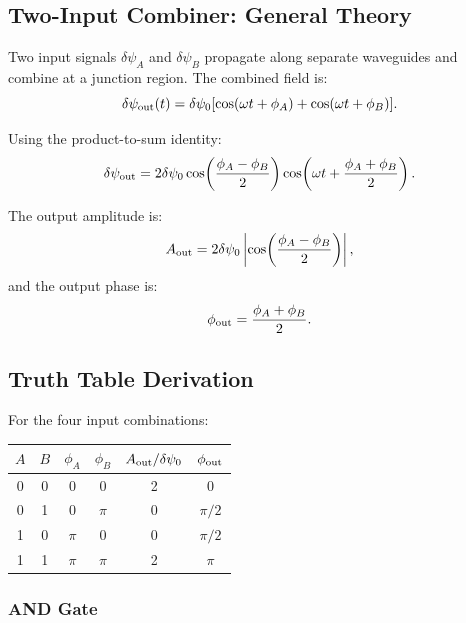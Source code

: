 \documentclass[aps,prd,twocolumn,superscriptaddress,nofootinbib,floatfix]{revtex4-2}
\begin{document}
\subsection{Two-Input Combiner: General Theory}

Two input signals $\delta\psi_A$ and $\delta\psi_B$ propagate
along separate waveguides and combine at a junction region.
The combined field is:
\begin{equation}
\delta\psi_{\rm out}(t) = \delta\psi_0[\cos(\omega t + \phi_A) + \cos(\omega t + \phi_B)].
\end{equation}

Using the product-to-sum identity:
\begin{equation}
\delta\psi_{\rm out} = 2\delta\psi_0\cos\!\left(\frac{\phi_A - \phi_B}{2}\right)\cos\!\left(\omega t + \frac{\phi_A + \phi_B}{2}\right).
\label{eq:combined}
\end{equation}

The output amplitude is:
\begin{equation}
A_{\rm out} = 2\delta\psi_0\left|\cos\!\left(\frac{\phi_A - \phi_B}{2}\right)\right|,
\end{equation}
and the output phase is:
\begin{equation}
\phi_{\rm out} = \frac{\phi_A + \phi_B}{2}.
\end{equation}

\subsection{Truth Table Derivation}

For the four input combinations:

\begin{center}
\begin{tabular}{cc|cc|cc}
$A$ & $B$ & $\phi_A$ & $\phi_B$ & $A_{\rm out}/\delta\psi_0$ & $\phi_{\rm out}$ \\
\hline
0 & 0 & 0 & 0 & 2 & 0 \\
0 & 1 & 0 & $\pi$ & 0 & $\pi/2$ \\
1 & 0 & $\pi$ & 0 & 0 & $\pi/2$ \\
1 & 1 & $\pi$ & $\pi$ & 2 & $\pi$ \\
\end{tabular}
\end{center}

\subsubsection{AND Gate}
\end{document}

